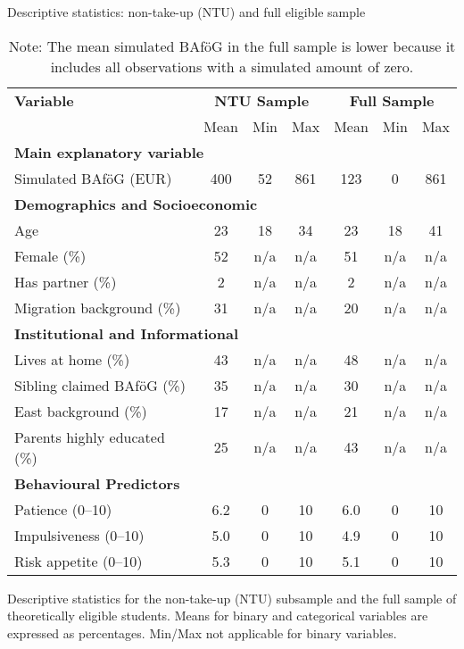 \begin{table}[H]
\footnotesize
\caption*{Descriptive statistics: non-take-up (NTU) and full eligible sample}
\centering
\begin{tabular}{lccc|ccc}
\toprule
\textbf{Variable} & \multicolumn{3}{c|}{\textbf{NTU Sample}} & \multicolumn{3}{c}{\textbf{Full Sample}} \\
& Mean & Min & Max & Mean & Min & Max \\
\midrule
\multicolumn{7}{l}{\textbf{Main explanatory variable}} \\
Simulated BAföG (EUR)       & 400    & 52    & 861   & 123    & 0    & 861   \\
\midrule
\multicolumn{6}{l}{\textbf{Demographics and Socioeconomic}} \\
Age                         & 23     & 18    & 34    & 23     & 18   & 41    \\
Female (\%)                 & 52     & n/a   & n/a   & 51     & n/a  & n/a   \\
Has partner (\%)            & 2      & n/a   & n/a   & 2      & n/a  & n/a   \\
Migration background (\%)   & 31     & n/a   & n/a   & 20     & n/a  & n/a   \\
\midrule
\multicolumn{6}{l}{\textbf{Institutional and Informational}} \\
Lives at home (\%)          & 43     & n/a   & n/a   & 48     & n/a  & n/a   \\
Sibling claimed BAföG (\%)  & 35     & n/a   & n/a   & 30     & n/a  & n/a   \\
East background (\%)        & 17     & n/a   & n/a   & 21     & n/a  & n/a   \\
Parents highly educated (\%)& 25     & n/a   & n/a   & 43     & n/a  & n/a   \\
\midrule
\multicolumn{6}{l}{\textbf{Behavioural Predictors}} \\
Patience (0--10)            & 6.2    & 0     & 10    & 6.0    & 0    & 10    \\
Impulsiveness (0--10)       & 5.0    & 0     & 10    & 4.9    & 0    & 10    \\
Risk appetite (0--10)       & 5.3    & 0     & 10    & 5.1    & 0    & 10    \\
\bottomrule
\end{tabular}
\caption{\small{Descriptive statistics for the non-take-up (NTU) subsample and the full sample of theoretically eligible students. Means for binary and categorical variables are expressed as percentages. Min/Max not applicable for binary variables.}}
\caption*{\small{Note: The mean simulated BAföG in the full sample is lower because it includes all observations with a simulated amount of zero.}}
\label{tab:descriptive_ntu_all}
\end{table}

